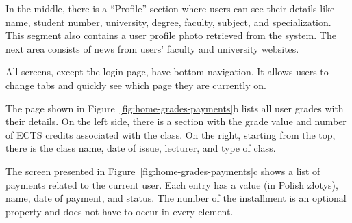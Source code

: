 In the middle, there is a ``Profile'' section where users can see their details like name, student number, university, degree, faculty, subject, and specialization. This segment also contains a user profile photo retrieved from the system. The next area consists of news from users' faculty and university websites.

All screens, except the login page, have bottom navigation. It allows users to change tabs and quickly see which page they are currently on.

The page shown in Figure~\ref{fig:home-grades-payments}b lists all user grades with their details. On the left side, there is a section with the grade value and number of ECTS credits associated with the class. On the right, starting from the top, there is the class name, date of issue, lecturer, and type of class.

The screen presented in  Figure~\ref{fig:home-grades-payments}c shows a list of payments related to the current user. Each entry has a value (in Polish złotys), name, date of payment, and status. The number of the installment is an optional property and does not have to occur in every element.

